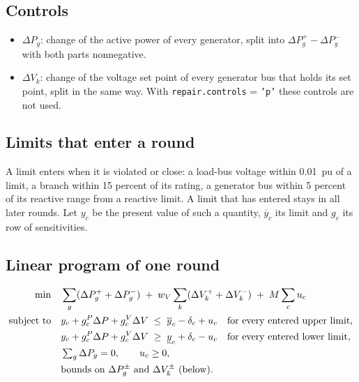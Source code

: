 \documentclass[a4paper,11pt]{article}
\newcommand{\opt}[1]{\texttt{#1}}
\begin{document}
\subsection{Controls}

\begin{itemize}[nosep]
  \item $\Delta P_g$: change of the active power of every generator, split into $\Delta P_g^+ - \Delta P_g^-$ with both parts nonnegative.
  \item $\Delta V_k$: change of the voltage set point of every generator bus that holds its set point, split in the same way. With \opt{repair.controls} = \texttt{'p'} these controls are not used.
\end{itemize}

\subsection{Limits that enter a round}

A limit enters when it is violated or close: a load-bus voltage within 0.01~pu of a limit, a branch within 15 percent of its rating, a generator bus within 5 percent of its reactive range from a reactive limit. A limit that has entered stays in all later rounds. Let $y_c$ be the present value of such a quantity, $\overline{y}_c$ its limit and $g_c$ its row of sensitivities.

\subsection{Linear program of one round}

\begin{align}
\min\quad & \sum_g (\Delta P_g^+ + \Delta P_g^-) \;+\; w_V\sum_k (\Delta V_k^+ + \Delta V_k^-) \;+\; M \sum_c u_c \label{eq:lp}\\
\text{subject to}\quad
& y_c + g_c^{P}\Delta P + g_c^{V}\Delta V \;\le\; \overline{y}_c - \delta_c + u_c \quad \text{for every entered upper limit}, \notag\\
& y_c + g_c^{P}\Delta P + g_c^{V}\Delta V \;\ge\; \underline{y}_c + \delta_c - u_c \quad \text{for every entered lower limit}, \notag\\
& \textstyle\sum_g \Delta P_g = 0, \qquad u_c \ge 0, \notag\\
& \text{bounds on } \Delta P_g^\pm \text{ and } \Delta V_k^\pm \text{ (below)}. \notag
\end{align}
\end{document}
